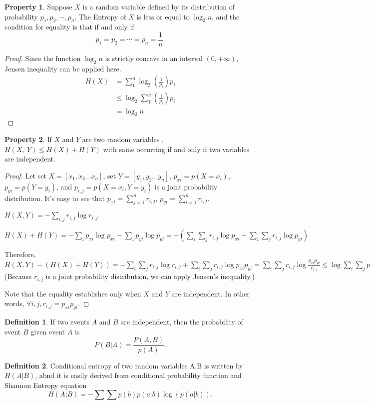\documentclass[letterpaper, 10 pt, conference]{ieeeconf}  %
\theoremstyle{definition}
\newtheorem{definition}{Definition}[section]
\theoremstyle{property}
\newtheorem{property}{Property}[section]
\begin{document}
\begin{property}
\label{prop:upperbound}
Suppose $X$ is a random variable defined by its distribution of probability $p_1, p_2,\cdots,p_n$. The Entropy of $X$ is less or equal to $\log_2 n$, and the condition for equality is that if and only if $$p_1=p_2=\cdots =p_n=\frac{1}{n}.$$
\end{property}
\begin{proof}
\label{proof:shanon[3]}
Since the function $\log_2n$ is strictly concave in an interval $(0, +\infty)$,  Jensen inequality can be applied here.
\begin{align*}
 H(X)&=\sum_1^n \log_2 \left(\frac{1}{p_i}\right) p_i\\
 &\leq \log_2 \sum_1^n \left(\frac{1}{p_i}\right) p_i\\
 &=\log_2 n
\end{align*}
\end{proof}



\begin{property}
\label{prop:sum_entropy}
If $X$ and $Y$ are two random variables ,$H(X,~Y)\leq H(X)+H(Y)$ with same occurring if and only if two variables are independent.
\end{property}

\begin{proof}
Let set $X=[x_1,x_2...x_n]$, set $Y=[y_1,y_2...y_n]$, $p_{xi}=p(X=x_i)$, $p_{yi}=p(Y=y_i)$, and $p_{i,j}=p(X=x_i,Y=y_i)$ is a joint probability distribution. It's easy to see that $p_{xi}=\sum_{j=1}^n r_{i,j}$, $p_{yi}=\sum_{i=1}^n r_{i,j}$.

$H(X,Y)=-\sum_{i,j}r_{i,j}\log r_{i,j}.$

$H(X)+H(Y)=-\sum_{i}p_{xi}\log p_{xi}-\sum_{i}p_{yi}\log p_{yi}=-(\sum_{i}\sum_{j}r_{i,j}\log p_{xi}+\sum_{i}\sum_{j}r_{i,j}\log p_{yi})$

Therefore, $H(X,Y)-(H(X)+H(Y))=-\sum_{i}\sum_{j}r_{i,j}\log r_{i,j}+\sum_{i}\sum_{j}r_{i,j}\log p_{xi}p_{yi}=\sum_{i}\sum_{j}r_{i,j}\log\frac{p_{xi}p_{yi}}{r_{i,j}}\leq \log\sum_{i}\sum_{j}p_{xi}p_{yi}=0$ (Because $r_{i,j}$ is a joint probability distribution, we can apply Jensen's inequality.)

Note that the equality establishes only when $X$ and $Y$ are independent. In other words, $\forall i,j, r_{i,j}=p_{xi}p_{yi}.$
\end{proof}

\begin{definition}
\label{def:conditional_probability}
If two events $A$ and $B$ are independent, then the probability of event $B$ given event $A$ is $$P(B|A)=\frac{P(A, B)}{p(A)}.$$ 

\end{definition}
\begin{definition}
\label{def:conditional_entropy}
Conditional entropy of two random variables A,B is written by $H(A|B)$, abnd it is easily derived from conditional probability function and Shannon Entropy equation
$$H(A|B)=-\sum \sum p(b)p(a|b)\log(p(a|b)).$$
\end{definition}
\end{document}
